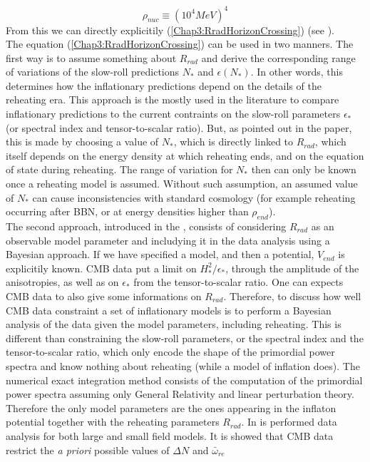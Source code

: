 \documentclass[11pt,a4paper,twoside]{book}
\begin{document}
 \begin{equation}
 	\label{Chap3:rhoNuc}
 	\rho_{nuc}\equiv(10^{4}MeV)^{4}
 \end{equation} 
From this we can directly explicitily (\ref{Chap3:RradHorizonCrossing}) (see \cite{Chap3:Martin_Ringeval}).\\
The equation (\ref{Chap3:RradHorizonCrossing}) can be used in two manners. The first way is to assume something about $ R_{rad} $ and derive the corresponding range of variations of the slow-roll predictions $ N_{*} $ and $\epsilon(N_{*})$. In other words, this determines how the inflationary predictions depend on the details of the reheating era. This approach is the mostly used in the literature to compare inflationary predictions to the current contraints on the slow-roll parameters $\epsilon_{*}$ (or spectral index and tensor-to-scalar ratio). But, as pointed out in the paper, this is made by choosing a value of $ N_{*} $, which is directly linked to $ R_{rad} $, which itself depends on the energy density at which reheating ends, and on the equation of state during reheating. The range of variation for $ N_{*} $ then can only be known once a reheating model is assumed. Without such assumption, an assumed value of $ N_{*} $ can cause inconsistencies with standard cosmology (for example reheating occurring after BBN, or at energy densities higher than $\rho_{end}$).\\
The second approach, introduced in the \cite{Chap3:Martin_Ringeval}, consists of considering $ R_{rad} $ as an observable model parameter and includying it in the data analysis using a Bayesian approach. If we have specified a model, and then a potential, $ V_{end} $ is explicitily known. CMB data put a limit on $ H_{*}^{2}/\epsilon_{*} $, through the amplitude of the anisotropies, as well as on $\epsilon_{*}$ from the tensor-to-scalar ratio. One can expects CMB data to also give some informations on $ R_{rad} $. Therefore, to discuss how well CMB data constraint a set of inflationary models is to perform a Bayesian analysis of the data given the model parameters, including reheating. This is different than constraining the slow-roll parameters, or the spectral index and the tensor-to-scalar ratio, which only encode the shape of the primordial power spectra and know nothing about reheating (while a model of inflation does). The numerical exact integration method consists of the computation of the primordial power spectra assuming only General Relativity and linear perturbation theory. Therefore the only model parameters are the ones appearing in the inflaton potential together with the reheating parameters $ R_{rad} $. In \cite{Chap3:Martin_Ringeval} is performed data analysis for both  large and small field models. It is showed that CMB data restrict the \textit{a priori} possible values of $ \Delta N $ and $\bar{\omega}_{re}$\\
\end{document}
